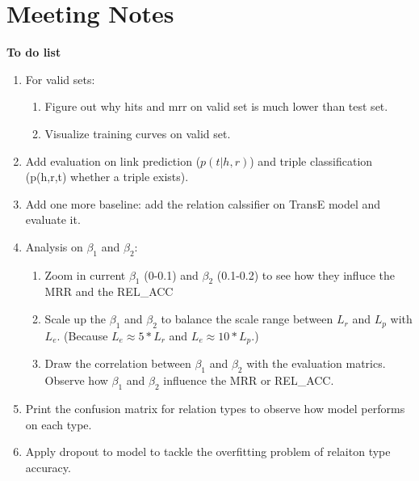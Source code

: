 \section{Meeting Notes}
\textbf{To do list}
\begin{enumerate}
    \item For valid sets:
        \begin{enumerate}
            \item Figure out why hits and mrr on valid set is much lower than test set. 
            \item Visualize training curves on valid set. 
        \end{enumerate}
    \item Add evaluation on link prediction ($p(t|h,r)$) and triple classification (p(h,r,t) whether a triple exists).
    \item Add one more baseline: add the relation calssifier on TransE model and evaluate it. 
    \item Analysis on $\beta_1$ and $\beta_2$: 
    \begin{enumerate}
        \item Zoom in current $\beta_1$ (0-0.1) and $\beta_2$ (0.1-0.2) to see how they influce the MRR and the  REL\_ACC 
        \item Scale up the $\beta_1$ and $\beta_2$ to balance the scale range between $L_r$ and $L_p$ with $L_e$. (Because $L_e \approx 5*L_r$ and $L_e \approx 10*L_p$.) 
        \item Draw the correlation between $\beta_1$ and $\beta_2$ with the evaluation matrics. Observe how $\beta_1$ and $\beta_2$ influence the MRR or REL\_ACC.
    \end{enumerate}
    \item Print the confusion matrix for relation types to observe how model performs on each type.
    \item Apply dropout to model to tackle the overfitting problem of relaiton type accuracy.  
\end{enumerate} 